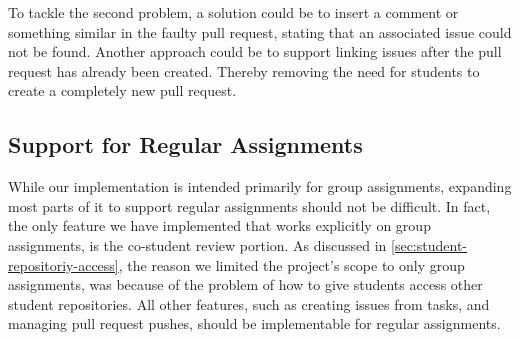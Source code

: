 To tackle the second problem, a solution could be to insert a comment or something similar in the faulty pull request, stating that an associated issue could not be found.
Another approach could be to support linking issues after the pull request has already been created.
Thereby removing the need for students to create a completely new pull request.

\subsection{Support for Regular Assignments}

While our implementation is intended primarily for group assignments, expanding most parts of it to support regular assignments should not be difficult.
In fact, the only feature we have implemented that works explicitly on group assignments, is the co-student review portion.
As discussed in \ref{sec:student-repositoriy-access}, the reason we limited the project's scope to only group assignments, was because of the problem of how to give students access other student repositories.
All other features, such as creating issues from tasks, and managing pull request pushes, should be implementable for regular assignments.
